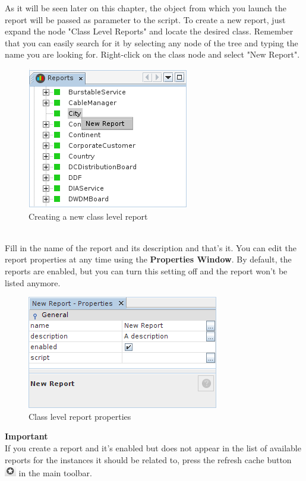 \documentclass[a4paper]{article}
\begin{document}
			As it will be seen later on this chapter, the object from which you launch the report will be passed as parameter to the script. To create a new report, just expand the node "Class Level Reports" and locate the desired class. Remember that you can easily search for it by selecting any node of the tree and typing the name you are looking for. Right-click on the class node and select "New Report".
			\begin{figure}[h!]
				\centering
				\includegraphics[scale=0.8]{img/reports_new_report.png}
				\caption{Creating a new class level report}
				\label{fig:reports_new_report}
			\end{figure}\\
			Fill in the name of the report and its description and that's it. You can edit the report properties at any time using the \textbf{Properties Window}. By default, the reports are enabled, but you can turn this setting off and the report won't be listed anymore.
			\begin{figure}[h!]
				\centering
				\includegraphics[scale=0.8]{img/reports_report_properties.png}
				\caption{Class level report properties}
				\label{fig:reports_report_properties}
			\end{figure}
			\begin{framed} {\large \textbf{Important}}\\
				If you create a report and it's enabled but does not appear in the list of available reports for the instances it should be related to, press the refresh cache button \includegraphics[width=0.5cm]{img/icon_refresh_cache.png} in the main toolbar.
			\end{framed}
\end{document}
